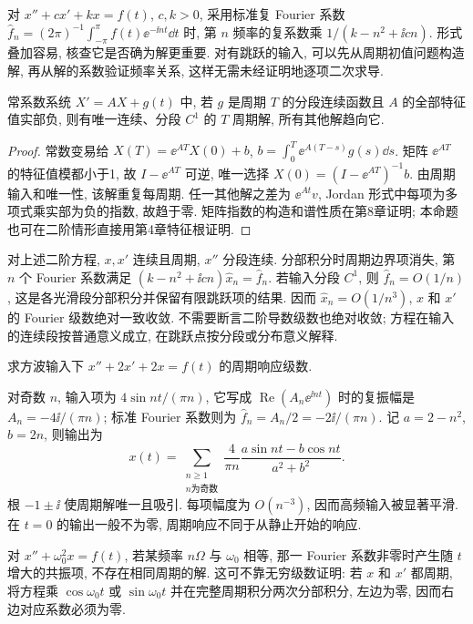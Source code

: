 对 $x''+cx'+kx=f(t)$, $c,k>0$, 采用标准复 Fourier 系数 $\widehat f_n=(2\pi)^{-1}\int_{-\pi}^{\pi}f(t)\ee^{-\ii nt}\dd t$ 时, 第 $n$ 频率的复系数乘 $1/(k-n^2+\ii cn)$. 形式叠加容易, 核查它是否确为解更重要. 对有跳跃的输入, 可以先从周期初值问题构造解, 再从解的系数验证频率关系, 这样无需未经证明地逐项二次求导.
\begin{proposition}\label{prop:periodic}
常系数系统 $X'=AX+g(t)$ 中, 若 $g$ 是周期 $T$ 的分段连续函数且 $A$ 的全部特征值实部负, 则有唯一连续、分段 $C^1$ 的 $T$ 周期解, 所有其他解趋向它.
\end{proposition}
\begin{proof}
常数变易给 $X(T)=\ee^{AT}X(0)+b$, $b=\int_0^T\ee^{A(T-s)}g(s)\dd s$. 矩阵 $\ee^{AT}$ 的特征值模都小于1, 故 $I-\ee^{AT}$ 可逆, 唯一选择 $X(0)=(I-\ee^{AT})^{-1}b$. 由周期输入和唯一性, 该解重复每周期. 任一其他解之差为 $\ee^{At}v$, Jordan 形式中每项为多项式乘实部为负的指数, 故趋于零. 矩阵指数的构造和谱性质在第8章证明; 本命题也可在二阶情形直接用第4章特征根证明.
\end{proof}
对上述二阶方程, $x,x'$ 连续且周期, $x''$ 分段连续. 分部积分时周期边界项消失, 第 $n$ 个 Fourier 系数满足 $(k-n^2+\ii cn)\widehat x_n=\widehat f_n$. 若输入分段 $C^1$, 则 $\widehat f_n=O(1/n)$, 这是各光滑段分部积分并保留有限跳跃项的结果. 因而 $\widehat x_n=O(1/n^3)$, $x$ 和 $x'$ 的 Fourier 级数绝对一致收敛. 不需要断言二阶导数级数也绝对收敛; 方程在输入的连续段按普通意义成立, 在跳跃点按分段或分布意义解释.
\begin{example}求方波输入下 $x''+2x'+2x=f(t)$ 的周期响应级数.\end{example}
\begin{solution}
对奇数 $n$, 输入项为 $4\sin nt/(\pi n)$, 它写成 $\operatorname{Re}(A_n\ee^{\ii nt})$ 时的复振幅是 $A_n=-4\ii/(\pi n)$; 标准 Fourier 系数则为 $\widehat f_n=A_n/2=-2\ii/(\pi n)$. 记 $a=2-n^2$, $b=2n$, 则输出为
\[
x(t)=\sum_{\substack{n\ge1\\ n\text{为奇数}}}\frac4{\pi n}
\frac{a\sin nt-b\cos nt}{a^2+b^2}.
\]
根 $-1\pm\ii$ 使周期解唯一且吸引. 每项幅度为 $O(n^{-3})$, 因而高频输入被显著平滑. 在 $t=0$ 的输出一般不为零, 周期响应不同于从静止开始的响应.
\end{solution}
对 $x''+\omega_0^2x=f(t)$, 若某频率 $n\Omega$ 与 $\omega_0$ 相等, 那一 Fourier 系数非零时产生随 $t$ 增大的共振项, 不存在相同周期的解. 这可不靠无穷级数证明: 若 $x$ 和 $x'$ 都周期, 将方程乘 $\cos\omega_0t$ 或 $\sin\omega_0t$ 并在完整周期积分两次分部积分, 左边为零, 因而右边对应系数必须为零.

